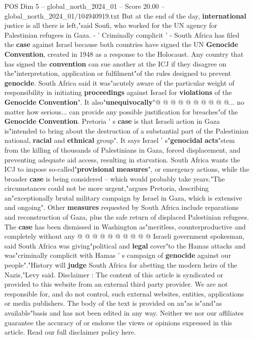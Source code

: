 \begin{textsample}{POS Dim 5 – global\_north\_2024\_01 – Score 20.00 – global\_north\_2024\_01/104940919.txt}
But at the end of the day, \textbf{international} justice is all there is left,"said Soufi, who worked for the UN agency for Palestinian refugees in Gaza. - ' Criminally complicit ' - South Africa has filed the \textbf{case} against Israel because both countries have signed the UN \textbf{Genocide} \textbf{Convention}, created in 1948 as a response to the Holocaust.
Any country that has signed the \textbf{convention} can sue another at the ICJ if they disagree on the"interpretation, application or fulfilment"of the rules designed to prevent \textbf{genocide}.
South Africa said it was"acutely aware of the particular weight of responsibility in initiating \textbf{proceedings} against Israel for \textbf{violations} of the \textbf{Genocide} \textbf{Convention}".
It also"\textbf{unequivocally}"@ @ @ @ @ @ @ @ @ @... no matter how serious... can provide any possible justification for breaches"of the \textbf{Genocide} \textbf{Convention}.
Pretoria ' s \textbf{case} is that Israeli action in Gaza is"intended to bring about the destruction of a substantial part of the Palestinian national, \textbf{racial} and \textbf{ethnical} group".
It says Israel ' s"\textbf{genocidal} \textbf{acts}"stem from the killing of thousands of Palestinians in Gaza, forced displacement, and preventing adequate aid access, resulting in starvation.
South Africa wants the ICJ to impose so-called"\textbf{provisional} \textbf{measures}", or emergency actions, while the broader \textbf{case} is being considered -- which would probably take years."The circumstances could not be more urgent,"argues Pretoria, describing an"exceptionally brutal military campaign by Israel in Gaza, which is extensive and ongoing".
Other \textbf{measures} requested by South Africa include reparations and reconstruction of Gaza, plus the safe return of displaced Palestinian refugees.
The \textbf{case} has been dismissed in Washington as"meritless, counterproductive and completely without any @ @ @ @ @ @ @ @ @ @ Israeli government spokesman, said South Africa was giving"political and \textbf{legal} cover"to the Hamas attacks and was"criminally complicit with Hamas ' s campaign of \textbf{genocide} against our people"."History will \textbf{judge} South Africa for abetting the modern heirs of the Nazis,"Levy said.
Disclaimer : The content of this article is syndicated or provided to this website from an external third party provider.
We are not responsible for, and do not control, such external websites, entities, applications or media publishers.
The body of the text is provided on an"as is"and"as available"basis and has not been edited in any way.
Neither we nor our affiliates guarantee the accuracy of or endorse the views or opinions expressed in this article.
Read our full disclaimer policy here.

\end{textsample}
